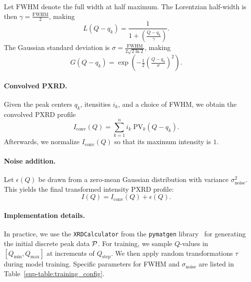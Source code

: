 Let $\mathrm{FWHM}$ denote the full width at half maximum. The Lorentzian half-width is then $\gamma = \tfrac{\mathrm{FWHM}}{2}$, making
\begin{equation}
    L(Q - q_k) = \frac{1}{1 + \left( \tfrac{Q - q_k}{\gamma}\right)}.
\end{equation}
The Gaussian standard deviation is $\sigma = \tfrac{\mathrm{FWHM}}{2\sqrt{2 \ln 2}}$, making 
\begin{equation}
    G(Q - q_k) = \exp\left( - \tfrac{1}{2} \left( \tfrac{Q - q_k}{\sigma}\right)^2 \right).
\end{equation}

\paragraph{Convolved PXRD.} Given the peak centers $q_k$, itensities $i_k$, and a choice of FWHM, we obtain the convolved PXRD profile
\begin{equation}
    I_{\mathrm{conv}}(Q) = \sum_{k=1}^n i_k\;\mathrm{PV}_k(Q - q_k).
\end{equation}
Afterwards, we normalize $I_{\mathrm{conv}}(Q)$ so that its maximum intensity is $1$.

\paragraph{Noise addition.} Let $\epsilon(Q)$ be drawn from a zero-mean Gaussian distribution with variance $\sigma^2_{\mathrm{noise}}$. This yields the final transformed intensity PXRD profile:
\begin{equation}
    I(Q) = I_{\mathrm{conv}}(Q) + \epsilon(Q).
\end{equation}

\paragraph{Implementation details.} In practice, we use the \texttt{XRDCalculator} from the \texttt{pymatgen} library~\cite{Ong2013} for generating the initial discrete peak data ${\mathcal P}$. For training, we sample $Q$-values in $[Q_{\mathrm{min}}, Q_{\mathrm{max}}]$ at increments of $Q_{\mathrm{step}}$. We then apply random transformations $\tau$ during model training. Specific parameters for FWHM and $\sigma_{\mathrm{noise}}$ are listed in Table~\ref{sup-table:training_config}.

